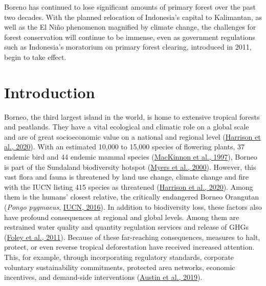 \documentclass[
  letterpaper,
  DIV=11,
  numbers=noendperiod]{scrreprt}
\begin{document}
Boreno has continued to lose significant amounts of primary forest over
the past two decades. With the planned relocation of Indonesia's capital
to Kalimantan, as well as the El Niño phenomenon magnified by climate
change, the challenges for forest conservation will continue to be
immense, even as government regulations such as Indonesia's moratorium
on primary forest clearing, introduced in 2011, begin to take effect.

\newpage
\tableofcontents


\hypertarget{sec-introduction}{%
\chapter{Introduction}\label{sec-introduction}}

Borneo, the third largest island in the world, is home to extensive
tropical forests and peatlands. They have a vital ecological and
climatic role on a global scale and are of great socioeconomic value on
a national and regional level
(\protect\hyperlink{ref-harrisonTropicalForestPeatland2020}{Harrison et
al., 2020}). With an estimated 10,000 to 15,000 species of flowering
plants, 37 endemic bird and 44 endemic mammal species
(\protect\hyperlink{ref-mackinnonEcologyKalimantan1997}{MacKinnon et
al., 1997}), Borneo is part of the Sundaland biodiversity hotspot
(\protect\hyperlink{ref-myersBiodiversityHotspotsConservation2000}{Myers
et al., 2000}). However, this vast flora and fauna is threatened by land
use change, climate change and fire with the IUCN listing 415 species as
threatened
(\protect\hyperlink{ref-harrisonTropicalForestPeatland2020}{Harrison et
al., 2020}). Among them is the humans' closest relative, the critically
endangered Borneo Orangutan (\emph{Pongo pygmaeus},
\protect\hyperlink{ref-iucnPongoPygmaeusAncrenaz2016}{IUCN, 2016}). In
addition to biodiversity loss, these factors also have profound
consequences at regional and global levels. Among them are restrained
water quality and quantity regulation services and release of GHGs
(\protect\hyperlink{ref-foleySolutionsCultivatedPlanet2011}{Foley et
al., 2011}). Because of these far-reaching consequences, measures to
halt, protect, or even reverse tropical deforestation have received
increased attention. This, for example, through incorporating regulatory
standards, corporate voluntary sustainability commitments, protected
area networks, economic incentives, and demand-side interventions
(\protect\hyperlink{ref-austinWhatCausesDeforestation2019}{Austin et
al., 2019}).
\end{document}
